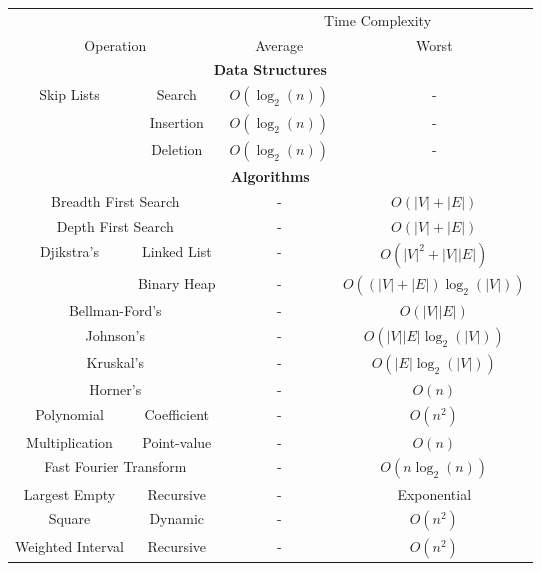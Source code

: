 \begin{center}
    \begin{tabular}{| c | c | c | c |}
        \hline
        \multicolumn{2}{|c|}{}          & \multicolumn{2}{c|}{Time Complexity} \\
        \cline{3-4}
        \multicolumn{2}{|c|}{Operation} & Average & Worst                      \\
        \hline \hline
        \multicolumn{4}{|c|}{\textbf{Data Structures}} \\
        \hline \hline
        \multirow{3}{*}{Skip Lists} 
        & Search        & $O(\log_2(n))$ & - \\
        & Insertion     & $O(\log_2(n))$ & - \\
        & Deletion      & $O(\log_2(n))$ & - \\
        \hline \hline
        \multicolumn{4}{|c|}{\textbf{Algorithms}} \\
        \hline \hline
        \multicolumn{2}{|c|}{Breadth First Search} & - & $O(|V| + |E|)$ \\
        \multicolumn{2}{|c|}{Depth First Search}   & - & $O(|V| + |E|)$ \\
        \hline \hline
        \multirow{2}{*}{Djikstra's} 
        & Linked List                      & - & $O(|V|^2 + |V||E|)$ \\
        & Binary Heap                      & - & $O((|V| + |E|)\log_2(|V|))$ \\
        \hline
        \multicolumn{2}{|c|}{Bellman-Ford's} & - & $O(|V||E|)$ \\
        \hline
        \multicolumn{2}{|c|}{Johnson's} & - & $O(|V||E|\log_2(|V|))$ \\
        \hline \hline
        \multicolumn{2}{|c|}{Kruskal's} & - & $O(|E|\log_2(|V|))$ \\
        \hline \hline
        \multicolumn{2}{|c|}{Horner's} & - & $O(n)$ \\
        \hline
        Polynomial     & Coefficient & - & $O(n^2)$ \\
        Multiplication & Point-value & - & $O(n)$ \\
        \hline
        \multicolumn{2}{|c|}{Fast Fourier Transform} & - & $O(n\log_2(n))$ \\
        \hline \hline
        Largest Empty & Recursive & - & Exponential \\
        Square        & Dynamic   & - & $O(n^2)$ \\
        \hline \hline
        Weighted Interval & Recursive & - & $O(n^2)$ \\

\end{tabular}
\end{center}
